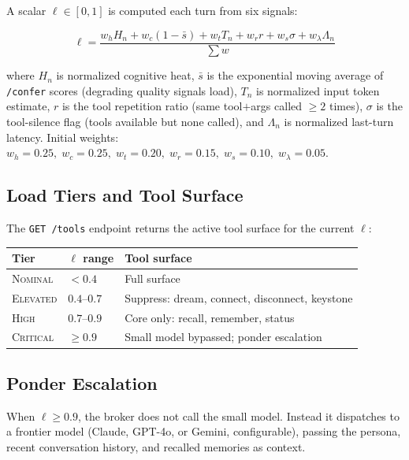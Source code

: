 \documentclass[twocolumn,10pt]{article}
\begin{document}
A scalar $\ell \in [0, 1]$ is computed each turn from six signals:

\begin{equation}
\ell = \frac{w_h H_n + w_c (1 - \bar{s}) + w_t T_n + w_r r + w_s \sigma + w_\lambda \Lambda_n}{\sum w}
\end{equation}

\noindent where $H_n$ is normalized cognitive heat, $\bar{s}$ is the
exponential moving average of \texttt{/confer} scores (degrading quality
signals load), $T_n$ is normalized input token estimate, $r$ is the tool
repetition ratio (same tool$+$args called $\geq 2$ times), $\sigma$ is the
tool-silence flag (tools available but none called), and $\Lambda_n$ is
normalized last-turn latency.  Initial weights:
$w_h = 0.25,\; w_c = 0.25,\; w_t = 0.20,\; w_r = 0.15,\; w_s = 0.10,\;
w_\lambda = 0.05$.

\subsection{Load Tiers and Tool Surface}

The \texttt{GET /tools} endpoint returns the active tool surface for the
current $\ell$:

\begin{center}
\footnotesize
\begin{tabular}{llp{4.5cm}}
\toprule
Tier & $\ell$ range & Tool surface \\
\midrule
\textsc{Nominal}   & $< 0.4$  & Full surface \\
\textsc{Elevated}  & $0.4$--$0.7$ & Suppress: dream, connect, disconnect, keystone \\
\textsc{High}      & $0.7$--$0.9$ & Core only: recall, remember, status \\
\textsc{Critical}  & $\geq 0.9$   & Small model bypassed; ponder escalation \\
\bottomrule
\end{tabular}
\end{center}

\subsection{Ponder Escalation}

When $\ell \geq 0.9$, the broker does not call the small model.  Instead
it dispatches to a frontier model (Claude, GPT-4o, or Gemini, configurable),
passing the persona, recent conversation history, and recalled memories as
context.
\end{document}
